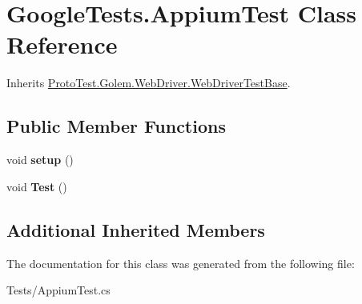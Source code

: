 \hypertarget{class_google_tests_1_1_appium_test}{\section{Google\-Tests.\-Appium\-Test Class Reference}
\label{class_google_tests_1_1_appium_test}
}


Inherits \hyperlink{class_proto_test_1_1_golem_1_1_web_driver_1_1_web_driver_test_base}{Proto\-Test.\-Golem.\-Web\-Driver.\-Web\-Driver\-Test\-Base}.

\subsection*{Public Member Functions}
\begin{DoxyCompactItemize}
\item 
\hypertarget{class_google_tests_1_1_appium_test_a1a43290c13188e66cc6a5d178918800c}{void {\bfseries setup} ()}\label{class_google_tests_1_1_appium_test_a1a43290c13188e66cc6a5d178918800c}

\item 
\hypertarget{class_google_tests_1_1_appium_test_a3bbaf5c9a645b43364dc9e3b13948412}{void {\bfseries Test} ()}\label{class_google_tests_1_1_appium_test_a3bbaf5c9a645b43364dc9e3b13948412}

\end{DoxyCompactItemize}
\subsection*{Additional Inherited Members}


The documentation for this class was generated from the following file\-:\begin{DoxyCompactItemize}
\item 
Tests/Appium\-Test.\-cs\end{DoxyCompactItemize}
